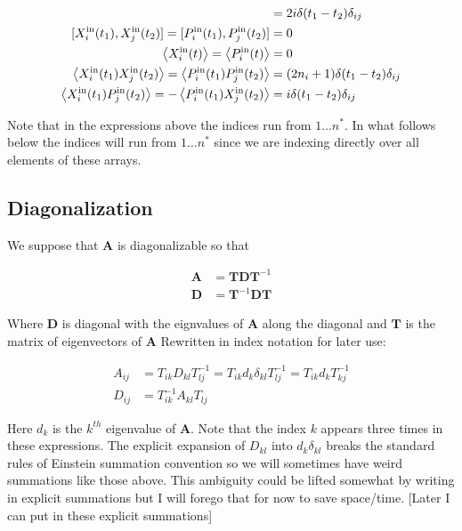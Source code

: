 \documentclass[12pt]{article}
\newcommand{\bv}[1]{\boldsymbol{#1}}
\begin{document}
\begin{align}
[X_i^{\text{in}}(t_1),P_j^{\text{in}}(t_2)] &= 2i\delta(t_1-t_2)\delta_{ij}\\
[X_i^{\text{in}}(t_1),X_j^{\text{in}}(t_2)] = [P_i^{\text{in}}(t_1),P_j^{\text{in}}(t_2)] &= 0\\
\Braket{X_{i}^{\text{in}}(t)} = \Braket{P_i^{\text{in}}(t)} &= 0\\
\Braket{X_i^{\text{in}}(t_1)X_j^{\text{in}}(t_2)} = \Braket{P_i^{\text{in}}(t_1)P_j^{\text{in}}(t_2)} &= (2n_i+1)\delta(t_1-t_2)\delta_{ij}\\
\Braket{X_i^{\text{in}}(t_1)P_j^{\text{in}}(t_2)} = -\Braket{P_i^{\text{in}}(t_1)X_j^{\text{in}}(t_2)} &= i\delta(t_1-t_2)\delta_{ij}
\end{align}

Note that in the expressions above the indices run from $1\ldots n^*$. In what follows below the indices will run from $1\ldots n^*$ since we are indexing directly over all elements of these arrays.


\subsection{Diagonalization}

We suppose that $\bv{A}$ is diagonalizable so that

\begin{align}
\bv{A} &= \bv{T}\bv{D}\bv{T}^{-1}\\
\bv{D} &= \bv{T}^{-1}\bv{D}\bv{T}
\end{align}

Where $\bv{D}$ is diagonal with the eignvalues of $\bv{A}$ along the diagonal and $\bv{T}$ is the matrix of eigenvectors of $\bv{A}$
Rewritten in index notation for later use:

\begin{align}
A_{ij} &= T_{ik}D_{kl}T^{-1}_{lj} = T_{ik}d_k\delta_{kl}T^{-1}_{lj} = T_{ik}d_k T^{-1}_{kj}\\
D_{ij} &= T^{-1}_{ik}A_{kl}T_{lj}
\end{align}

Here $d_k$ is the $k^{th}$ eigenvalue of $\bv{A}$. Note that the index $k$ appears three times in these expressions. The explicit expansion of $D_{kl}$ into $d_k \delta_{kl}$ breaks the standard rules of Einstein summation convention so we will sometimes have weird summations like those above. This ambiguity could be lifted somewhat by writing in explicit summations but I will forego that for now to save space/time. [Later I can put in these explicit summations]
\end{document}
